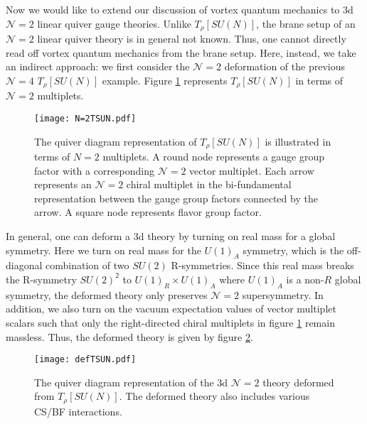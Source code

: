 \documentclass[a4paper,11pt]{article}
\begin{document}
Now we would like to extend our discussion of vortex quantum mechanics to 3d $\mathcal N = 2$ linear quiver gauge theories. Unlike $T_\rho [SU(N)]$, the brane setup of an $\mathcal N = 2$ linear quiver theory is in general not known. Thus, one cannot directly read off vortex quantum mechanics from the brane setup. Here, instead, we take an indirect approach: we first consider the $\mathcal N = 2$ deformation of the previous $\mathcal N = 4$ $T_\rho [SU(N)]$ example. Figure \ref{fig:N=2 T[SU(N)]} represents $T_\rho [SU(N)]$ in terms of $\mathcal N = 2$ multiplets.
%
\begin{figure}[tbp]
\centering %
\texttt{[image: N=2TSUN.pdf]}
\caption{\label{fig:N=2 T[SU(N)]} The quiver diagram representation of $T_\rho [SU(N)]$ is illustrated in terms of $N=2$ multiplets. A round node represents a gauge group factor with a corresponding $\mathcal N = 2$ vector multiplet. Each arrow represents an $\mathcal N = 2$ chiral multiplet in the bi-fundamental representation between the gauge group factors connected by the arrow. A square node represents flavor group factor.}
\end{figure}
%
In general, one can deform a 3d theory by turning on real mass for a global symmetry. Here we turn on real mass for the $U(1)_A$ symmetry, which is the off-diagonal combination of two $SU(2)$ R-symmetries. Since this real mass breaks the R-symmetry $SU(2)^2$ to $U(1)_R \times U(1)_A$ where $U(1)_A$ is a non-$R$ global symmetry, the deformed theory only preserves $\mathcal N = 2$ supersymmetry. In addition, we also turn on the vacuum expectation values of vector multiplet scalars such that only the right-directed chiral multiplets in figure \ref{fig:N=2 T[SU(N)]} remain massless. Thus, the deformed theory is given by figure \ref{fig:def T[SU(N)]}.
%
\begin{figure}[tbp]
\centering %
\texttt{[image: defTSUN.pdf]}
\caption{\label{fig:def T[SU(N)]} The quiver diagram representation of the 3d $\mathcal N = 2$ theory deformed from $T_\rho [SU(N)]$. The deformed theory also includes various CS/BF interactions.}
\end{figure}
%
\end{document}
